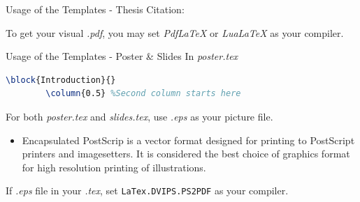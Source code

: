 \documentclass[
 size=12pt,
 paper=smartboard, %
 mode=present, %
 display=slides, %
style=tuliplab,
pauseslide,
fleqn,leqno]{powerdot}
\begin{document}
\begin{slide}[toc=,bm=]{Usage of the Templates - Thesis}
	Citation:\\
	\begin{center}
	\end{center}
	To get your visual \textit{.pdf}, you may set \textit{PdfLaTeX} or \textit{LuaLaTeX} as your compiler.
\end{slide}


\begin{slide}[toc=,bm=,method=direct]{Usage of the Templates - Poster \& Slides}
	In \textit{poster.tex}\\
	\begin{lstlisting}[language=TeX]
		\block{Introduction}{} 
		\column{0.5} %Second column starts here
	\end{lstlisting}
	For both \textit{poster.tex} and \textit{slides.tex}, use \textit{.eps} as your picture file.\\
	\begin{itemize}
		\item Encapsulated PostScrip is a vector format designed for printing to PostScript printers and imagesetters. 
		It is considered the best choice of graphics format for high resolution printing of illustrations.\\
	\end{itemize}
	If \textit{.eps} file in your \textit{.tex}, set \texttt{LaTex.DVIPS.PS2PDF} as your compiler.
	
\end{slide}
\end{document}

